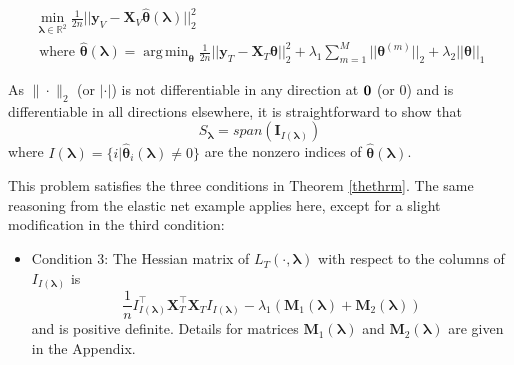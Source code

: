 \documentclass[10pt,letterpaper]{article}
\DeclareMathOperator*{\argmin}{arg\,min}
\begin{document}
\begin{equation}
\begin{array}{c}
\min_{\boldsymbol{\lambda} \in \mathbb{R}^2} \frac{1}{2n} \bigl\lvert\bigl\lvert \boldsymbol{y}_V - \boldsymbol{X}_V \hat{\boldsymbol{\theta}}(\boldsymbol{\lambda}) \bigl\rvert\bigl\rvert^2_2 \\
\text{ where }
\hat{\boldsymbol{\theta}}(\boldsymbol{\lambda}) = \argmin_{\boldsymbol{\theta}} \frac{1}{2n} \bigl\lvert\bigl\lvert \boldsymbol{y}_T - \boldsymbol{X}_T \boldsymbol{\theta} \bigl\rvert\bigl\rvert^2_2
+ \lambda_1 \sum_{m=1}^M \lvert\lvert \boldsymbol\theta^{(m)} \rvert \rvert_2
+ \lambda_2 \lvert\lvert \boldsymbol\theta \rvert \rvert_1
\end{array}
\end{equation}

As $\|\cdot\|_2$ (or $|\cdot|$) is not differentiable in any direction at ${\bf 0}$ (or $0$) and is differentiable in all directions elsewhere, it is straightforward to show that 
\begin{equation}
S_{\boldsymbol \lambda} = span(\boldsymbol I_{I(\boldsymbol\lambda)})
\end{equation}
where $I(\boldsymbol\lambda) = \{i | \hat{\boldsymbol{\theta}}_i(\boldsymbol\lambda) \ne 0\}$ are the nonzero indices of $\hat{\boldsymbol{\theta}}(\boldsymbol{\lambda})$. 

This problem satisfies the three conditions in Theorem \ref{thethrm}. The same reasoning from the elastic net example applies here, except for a slight modification in the third condition:

\begin{itemize}
\item[] Condition 3: The Hessian matrix of $L_T(\cdot, \boldsymbol{\lambda})$ with respect to the columns of $I_{I(\boldsymbol \lambda)}$ is
\begin{equation}
\frac{1}{n} I_{I(\boldsymbol \lambda)}^\top \boldsymbol{X}_{T}^\top \boldsymbol{X}_{T} I_{I(\boldsymbol \lambda)}
- \lambda_1 \left(\boldsymbol{M}_1(\boldsymbol\lambda) + \boldsymbol{M}_2(\boldsymbol\lambda) \right)
\end{equation}
and is positive definite. Details for matrices $\boldsymbol{M}_1(\boldsymbol\lambda)$ and $\boldsymbol{M}_2(\boldsymbol\lambda)$ are given in the Appendix. \hfill {}
\end{itemize}
\end{document}
